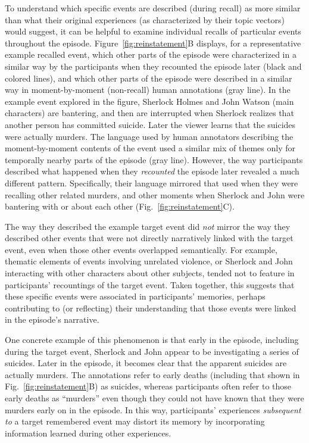 \documentclass{article}
\begin{document}
To understand which specific events are described (during recall) as more similar than what their original experiences (as characterized by their topic vectors) would suggest, it can be helpful to examine individual recalls of particular events throughout the episode.  Figure~\ref{fig:reinstatement}B displays, for a representative example recalled event, which other parts of the episode were characterized in a similar way by the participants when they recounted the episode later (black and colored lines), and which other parts of the episode were described in a similar way in moment-by-moment (non-recall) human annotations (gray line).  In the example event explored in the figure, Sherlock Holmes and John Watson (main characters) are bantering, and then are interrupted when Sherlock realizes that another person has committed suicide.  Later the viewer learns that the suicides were actually murders.  The language used by human annotators describing the moment-by-moment contents of the event used a similar mix of themes only for temporally nearby parts of the episode (gray line).  However, the way participants described what happened when they \textit{recounted} the episode later revealed a much different pattern.  Specifically, their language mirrored that used when they were recalling other related murders, and other moments when Sherlock and John were bantering with or about each other (Fig.~\ref{fig:reinstatement}C).

The way they described the example target event did \textit{not} mirror the way they described other events that were not directly narratively linked with the target event, even when those other events overlapped semantically.  For example, thematic elements of events involving unrelated violence, or Sherlock and John interacting with other characters about other subjects, tended not to feature in participants' recountings of the target event.  Taken together, this suggests that these specific events were associated in participants' memories, perhaps contributing to (or reflecting) their understanding that those events were linked in the episode's narrative.

One concrete example of this phenomenon is that early in the episode, including during the target event, Sherlock and John appear to be investigating a series of suicides.  Later in the episode, it becomes clear that the apparent suicides are actually murders.  The annotations refer to early deaths (including that shown in Fig.~\ref{fig:reinstatement}B) as suicides, whereas participants often refer to those early deaths as ``murders'' even though they could not have known that they were murders early on in the episode.  In this way, participants' experiences \textit{subsequent to} a target remembered event may distort its memory by incorporating information learned during other experiences.
\end{document}
